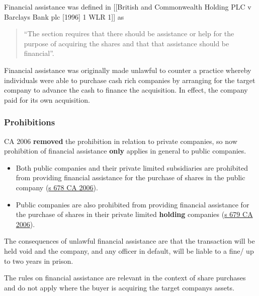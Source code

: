 \documentclass[
]{article}
\newenvironment{Shaded}{}{}
\newcommand{\NormalTok}[1]{#1}
\providecommand{\tightlist}{%
  \setlength{\itemsep}{0pt}\setlength{\parskip}{0pt}}
\begin{document}
Financial assistance was defined in {[}{[}British and Commonwealth
Holding PLC v Barclays Bank plc {[}1996{]} 1 WLR 1{]}{]} as

\begin{quote}
``The section requires that there should be assistance or help for the
purpose of acquiring the shares and that that assistance should be
financial''.
\end{quote}

Financial assistance was originally made unlawful to counter a practice
whereby individuals were able to purchase cash rich companies by
arranging for the target company to advance the cash to finance the
acquisition. In effect, the company paid for its own acquisition.

\hypertarget{prohibitions}{%
\subsubsection{Prohibitions}\label{prohibitions}}

CA 2006 \textbf{removed} the prohibition in relation to private
companies, so now prohibition of financial assistance \textbf{only}
applies in general to public companies.

\begin{itemize}
\tightlist
\item
  Both public companies and their private limited subsidiaries are
  prohibited from providing financial assistance for the purchase of
  shares in the public company
  (\href{https://www.legislation.gov.uk/ukpga/2006/46/section/678}{s 678
  CA 2006}).
\item
  Public companies are also prohibited from providing financial
  assistance for the purchase of shares in their private limited
  \textbf{holding} companies
  (\href{https://www.legislation.gov.uk/ukpga/2006/46/section/679}{s 679
  CA 2006}).
\end{itemize}

The consequences of unlawful financial assistance are that the
transaction will be held void and the company, and any officer in
default, will be liable to a fine/ up to two years in prison.

\begin{Shaded}
\begin{Highlighting}[]
\NormalTok{The rules on financial assistance are relevant in the context of share purchases and do not apply where the buyer is acquiring the target company\textquotesingle{}s assets.}
\end{Highlighting}
\end{Shaded}
\end{document}

